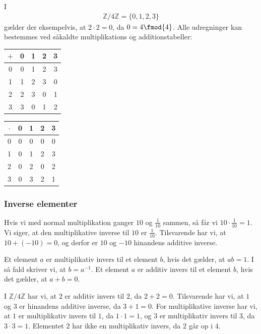 \begin{exa}
I 
\begin{align*}
\mathbb{Z}/4\mathbb{Z} = \{0,1,2,3\}
\end{align*}
gælder der eksempelvis, at $2\cdot 2 = 0$, da $0 =  4 \fmod{4}$. Alle udregninger kan bestemmes ved såkaldte multiplikations og additionstabeller:
\begin{center}
\begin{tabular}{c|cccc}
$+$ & 0 & 1 & 2 & 3\\
\hline
0 & 0 & 1 & 2 & 3\\
1 & 1 & 2 & 3 & 0\\
2 & 2 & 3 & 0 & 1\\
3 & 3 & 0 & 1 & 2\\

\end{tabular}
\hspace{1cm}
\begin{tabular}{c|cccc}
$\cdot $ & 0 & 1 & 2 & 3\\
\hline
0 & 0 & 0 & 0 & 0\\
1 & 0 & 1 & 2 & 3\\
2 & 0 & 2 & 0 & 2\\
3 & 0 & 3 & 2 & 1\\ 
\end{tabular}
\end{center}
\phantom{h}
\end{exa}

\subsubsection*{Inverse elementer}
Hvis vi med normal multiplikation ganger $10$ og $\frac{1}{10}$ sammen, så får vi $10\cdot \frac{1}{10} =1$. Vi siger, at den multiplikative inverse til $10$ er $\frac{1}{10}$. Tilsvarende har vi, at $10 + (-10) = 0$, og derfor er $10$ og $-10$ hinandens additive inverse. 
\begin{defn}
Et element $a$ er multiplikativ invers til et element $b$, hvis det gælder, at $ab = 1$. I så fald skriver vi, at $b = a^{-1}$. 
Et element $a$ er additiv invers til et element $b$, hvis det gælder, at $a+b=0$. 
\end{defn} 
\begin{exa}
I $\mathbb{Z}/4\mathbb{Z}$ har vi, at $2$ er additiv invers til $2$, da $2+2 = 0$. Tilsvarende har vi, at $1$ og $3$ er hinandens additive inverse, da $3+1 = 0$. For multiplikative inverse har vi, at $1$ er multiplikativ invers til $1$, da $1\cdot 1 = 1$, og $3$ er multiplikativ invers til $3$, da $3\cdot 3 = 1$. Elementet $2$ har ikke en multiplikativ invers, da $2$ går op i $4$.   
\end{exa}

